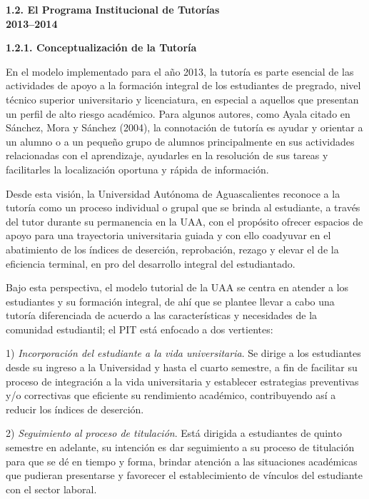 {\bfseries 1.2. El Programa Institucional de Tutorías\\ 2013--2014}

{\bfseries 1.2.1. Conceptualización de la Tutoría}

En el modelo implementado para el año 2013,  la tutoría es parte esencial de
las actividades de apoyo a la formación integral de los estudiantes de
pregrado, nivel técnico superior universitario y licenciatura, en especial
a aquellos que presentan un perfil de alto riesgo académico. Para algunos
autores, como Ayala citado en Sánchez, Mora y Sánchez (2004), la
connotación de tutoría es ayudar y orientar a un alumno o a un pequeño
grupo de alumnos principalmente en sus actividades relacionadas con el
aprendizaje, ayudarles en la resolución de sus tareas y facilitarles la
localización oportuna y rápida de información.

Desde esta visión, la Universidad Autónoma de Aguascalientes reconoce a la
tutoría como un proceso individual o grupal que se brinda al estudiante, a
través del tutor durante su permanencia en la UAA, con el propósito ofrecer
espacios de apoyo para una trayectoria universitaria guiada y con ello
coadyuvar en el abatimiento de los índices de deserción, reprobación,
rezago y elevar el de la eficiencia terminal, en pro del desarrollo
integral del estudiantado.

Bajo esta perspectiva, el modelo tutorial de la UAA se centra en atender a
los estudiantes y su formación integral, de ahí que se plantee llevar a
cabo una tutoría diferenciada de acuerdo a las características y
necesidades de la comunidad estudiantil; el PIT está enfocado a dos
vertientes:

\begin{Obs}
\item[1)] \textit{Incorporación del estudiante a la vida universitaria}. Se dirige
a los estudiantes desde su ingreso a la Universidad y hasta el cuarto
semestre, a fin de facilitar su proceso de integración a la vida
universitaria y establecer estrategias preventivas y/o correctivas que
eficiente su rendimiento académico, contribuyendo así a reducir los índices
de deserción.

\item[2)] \textit{Seguimiento al proceso de titulación}. Está dirigida a
estudiantes de quinto semestre en adelante, su intención es dar seguimiento
a su proceso de titulación para que se dé en tiempo y forma, brindar
atención a las situaciones académicas que pudieran presentarse y favorecer
el establecimiento de vínculos del estudiante con el sector laboral.
\end{Obs}

